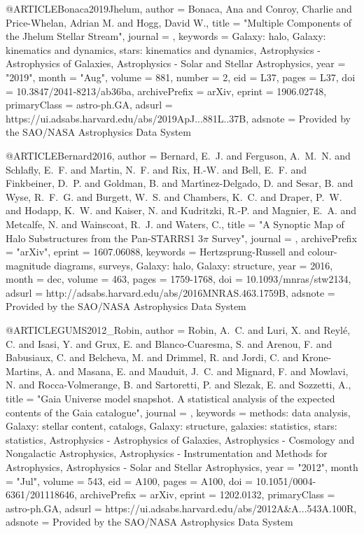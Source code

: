 \documentclass[apj]{emulateapj}
\begin{document}
{{{{{{{{{{{{{{@ARTICLE{Bonaca2019Jhelum,
       author = {{Bonaca}, Ana and {Conroy}, Charlie and {Price-Whelan}, Adrian M. and
         {Hogg}, David W.},
        title = "{Multiple Components of the Jhelum Stellar Stream}",
      journal = {\apjl},
     keywords = {Galaxy: halo, Galaxy: kinematics and dynamics, stars: kinematics and dynamics, Astrophysics - Astrophysics of Galaxies, Astrophysics - Solar and Stellar Astrophysics},
         year = "2019",
        month = "Aug",
       volume = {881},
       number = {2},
          eid = {L37},
        pages = {L37},
          doi = {10.3847/2041-8213/ab36ba},
archivePrefix = {arXiv},
       eprint = {1906.02748},
 primaryClass = {astro-ph.GA},
       adsurl = {https://ui.adsabs.harvard.edu/abs/2019ApJ...881L..37B},
      adsnote = {Provided by the SAO/NASA Astrophysics Data System}
}




@ARTICLE{Bernard2016,
   author = {{Bernard}, E.~J. and {Ferguson}, A.~M.~N. and {Schlafly}, E.~F. and 
	{Martin}, N.~F. and {Rix}, H.-W. and {Bell}, E.~F. and {Finkbeiner}, D.~P. and 
	{Goldman}, B. and {Mart{\'{\i}}nez-Delgado}, D. and {Sesar}, B. and 
	{Wyse}, R.~F.~G. and {Burgett}, W.~S. and {Chambers}, K.~C. and 
	{Draper}, P.~W. and {Hodapp}, K.~W. and {Kaiser}, N. and {Kudritzki}, R.-P. and 
	{Magnier}, E.~A. and {Metcalfe}, N. and {Wainscoat}, R.~J. and 
	{Waters}, C.},
    title = "{A Synoptic Map of Halo Substructures from the Pan-STARRS1 3{$\pi$} Survey}",
  journal = {\mnras},
archivePrefix = "arXiv",
   eprint = {1607.06088},
 keywords = {Hertzsprung-Russell and colour-magnitude diagrams, surveys, Galaxy: halo, Galaxy: structure},
     year = 2016,
    month = dec,
   volume = 463,
    pages = {1759-1768},
      doi = {10.1093/mnras/stw2134},
   adsurl = {http://adsabs.harvard.edu/abs/2016MNRAS.463.1759B},
  adsnote = {Provided by the SAO/NASA Astrophysics Data System}
}


@ARTICLE{GUMS2012_Robin,
       author = {{Robin}, A.~C. and {Luri}, X. and {Reyl{\'e}}, C. and {Isasi}, Y. and
         {Grux}, E. and {Blanco-Cuaresma}, S. and {Arenou}, F. and
         {Babusiaux}, C. and {Belcheva}, M. and {Drimmel}, R. and {Jordi}, C. and
         {Krone-Martins}, A. and {Masana}, E. and {Mauduit}, J.~C. and
         {Mignard}, F. and {Mowlavi}, N. and {Rocca-Volmerange}, B. and
         {Sartoretti}, P. and {Slezak}, E. and {Sozzetti}, A.},
        title = "{Gaia Universe model snapshot. A statistical analysis of the expected contents of the Gaia catalogue}",
      journal = {\aap},
     keywords = {methods: data analysis, Galaxy: stellar content, catalogs, Galaxy: structure, galaxies: statistics, stars: statistics, Astrophysics - Astrophysics of Galaxies, Astrophysics - Cosmology and Nongalactic Astrophysics, Astrophysics - Instrumentation and Methods for Astrophysics, Astrophysics - Solar and Stellar Astrophysics},
         year = "2012",
        month = "Jul",
       volume = {543},
          eid = {A100},
        pages = {A100},
          doi = {10.1051/0004-6361/201118646},
archivePrefix = {arXiv},
       eprint = {1202.0132},
 primaryClass = {astro-ph.GA},
       adsurl = {https://ui.adsabs.harvard.edu/abs/2012A&A...543A.100R},
      adsnote = {Provided by the SAO/NASA Astrophysics Data System}
}


}}}}}}}}}}}}}}
\end{document}
